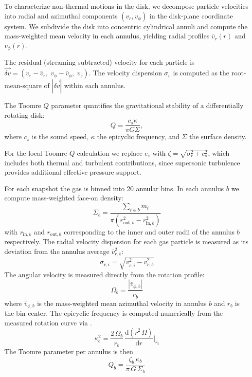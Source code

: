 \documentclass[twocolumn]{openjournal}
\begin{document}
To characterize non-thermal motions in the disk, we decompose
particle velocities into radial and azimuthal components
$(v_r, v_\phi)$ in the disk-plane coordinate system.
We subdivide the disk into concentric cylindrical annuli and compute
the mass-weighted mean velocity in each annulus, yielding radial
profiles $\bar{v}_r(r)$ and $\bar{v}_\phi(r)$.

The residual (streaming-subtracted) velocity for each particle is
$\vec{\delta v} = (v_r - \bar{v}_r,\; v_\phi - \bar{v}_\phi,\; v_z)$.
The velocity dispersion $\sigma_v$ is computed as the root-mean-square
of $|\vec{\delta v}|$ within each annulus.

The Toomre $Q$ parameter quantifies the gravitational stability
of a differentially rotating disk:
\begin{equation}
	\label{eq:toomreq}
	Q = \frac{c_s \kappa}{\pi G \Sigma},
\end{equation}
where $c_s$ is the sound speed, $\kappa$ the epicyclic frequency,
and $\Sigma$ the surface density.

For the local Toomre $Q$ calculation we replace $c_s$ with
$\zeta = \sqrt{\sigma_r^2 + c_s^2}$, which includes both thermal
and turbulent contributions, since supersonic turbulence provides
additional effective pressure support.

For each snapshot the gas is binned into 20 annular bins.
In each annulus $b$ we compute mass-weighted face-on density:
\begin{equation}
	\Sigma_b = \frac{\sum_{i\in b} m_i}{\pi(r_{\mathrm{out},b}^2 - r_{\mathrm{in},b}^2)}
\end{equation}
with $r_{\mathrm{in},b}$ and $r_{\mathrm{out},b}$ corresponding to the inner
and outer radii of the annulus $b$ respectively.
The radial velocity dispersion for each gas particle is measured as its deviation from the annulus average $\bar{v}_{r,b}^2$:
\begin{equation}
	\sigma_{r,i} = \sqrt{v_{r,i}^2 - \bar{v}_{r,b}^2}
\end{equation}
The angular velocity is measured directly from the rotation profile:
\begin{equation}
	\Omega_b = \frac{|\bar{v}_{\phi,b}|}{r_b}
\end{equation}
where $\bar{v}_{\phi,b}$ is the mass-weighted mean azimuthal velocity in annulus
$b$ and $r_b$ is the bin center. The epicyclic frequency is computed numerically
from the measured rotation curve via \citep{Pringle_King_2007}.
\begin{equation}
	\kappa_b^2 = \frac{2\,\Omega_b}{r_b}\,\frac{\mathrm{d}(r^2\,\Omega)}{\mathrm{d}r}\bigg|_{r_b}
\end{equation}
The Toomre parameter per annulus is then
\begin{equation}
	Q_b = \frac{\zeta_b \,\kappa_b}{\pi\,G\,\Sigma_b}
\end{equation}
\end{document}
